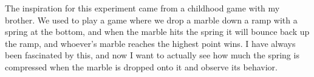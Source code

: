 The inspiration for this experiment came from a childhood game with my brother. We used to
play a game where we drop a marble down a ramp with a spring at the bottom, and when the
marble hits the spring it will bounce back up the ramp, and whoever’s marble reaches the
highest point wins. I have always been fascinated by this, and now I want to actually see how
much the spring is compressed when the marble is dropped onto it and observe its behavior.